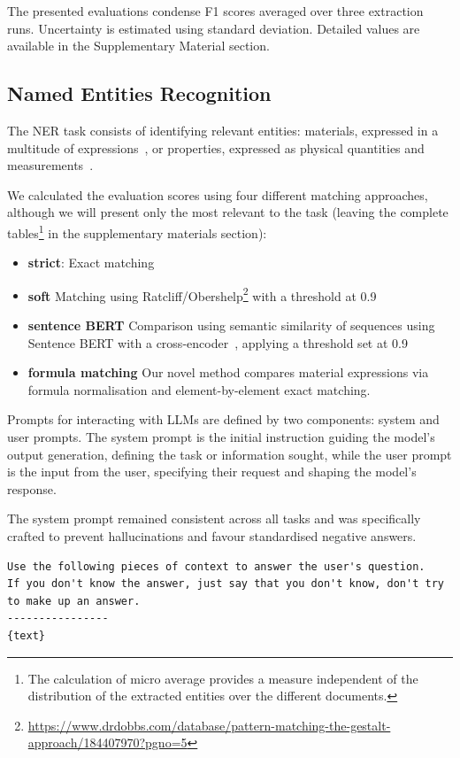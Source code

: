 \documentclass[a4paper]{article}
\begin{document}
The presented evaluations condense F1 scores averaged over three extraction runs. Uncertainty is estimated using standard deviation. 
Detailed values are available in the Supplementary Material section.

\subsection{Named Entities Recognition}
\label{sec:ner}
The NER task consists of identifying relevant entities: materials, expressed in a multitude of expressions~\cite{lfoppiano2021supermat}, or properties, expressed as physical quantities and measurements~\cite{foppiano2019quantities}. 

We calculated the evaluation scores using four different matching approaches, although we will present only the most relevant to the task (leaving the complete tables\footnote{The calculation of micro average provides a measure independent of the distribution of the extracted entities over the different documents.} in the supplementary materials section): 
\begin{itemize}
    \item \textbf{strict}: Exact matching
    \item \textbf{soft} Matching using Ratcliff/Obershelp\footnote{\url{https://www.drdobbs.com/database/pattern-matching-the-gestalt-approach/184407970?pgno=5}} with a threshold at 0.9
    \item \textbf{sentence BERT} Comparison using semantic similarity of sequences using Sentence BERT with a cross-encoder~\cite{reimers2019sentencebert}, applying a threshold set at 0.9
    \item \textbf{formula matching} Our novel method compares material expressions via formula normalisation and element-by-element exact matching.
\end{itemize}

Prompts for interacting with LLMs are defined by two components: system and user prompts. 
The system prompt is the initial instruction guiding the model's output generation, defining the task or information sought, while the user prompt is the input from the user, specifying their request and shaping the model's response.

The system prompt remained consistent across all tasks and was specifically crafted to prevent hallucinations and favour standardised negative answers.

\begin{lstlisting}[caption=Generic system prompt common to all requests]
Use the following pieces of context to answer the user's question. 
If you don't know the answer, just say that you don't know, don't try to make up an answer. 
----------------
{text}
\end{lstlisting}
\end{document}
